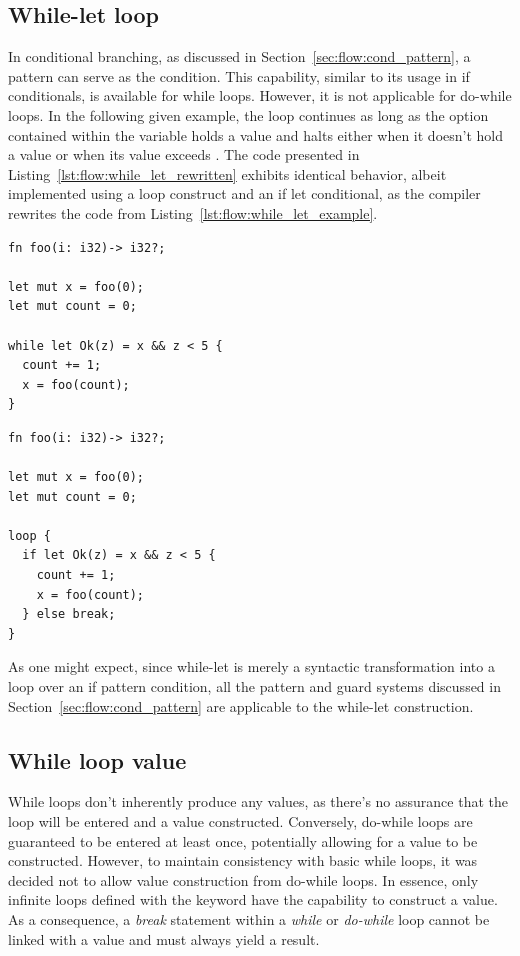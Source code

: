 \subsection{While-let loop}
\label{sec:flow:while_let_loop}

In conditional branching, as discussed in Section~\ref{sec:flow:cond_pattern}, a
pattern can serve as the condition. This capability, similar to its usage in if
conditionals, is available for while loops. However, it is not applicable for
do-while loops. In the following given example, the loop continues as long as
the option contained within the variable  holds a value and halts
either when it doesn't hold a value or when its value exceeds . The
code presented in Listing~\ref{lst:flow:while_let_rewritten} exhibits identical
behavior, albeit implemented using a loop construct and an if let conditional,
as the compiler rewrites the code from Listing~\ref{lst:flow:while_let_example}.

\begin{lstlisting}[style=coloredverbatim, caption=While-let example, label=lst:flow:while_let_example]
fn foo(i: i32)-> i32?;

let mut x = foo(0);
let mut count = 0;

while let Ok(z) = x && z < 5 {
  count += 1;
  x = foo(count);
}
\end{lstlisting}

\begin{lstlisting}[style=coloredverbatim, caption=While-let rewritten using loop and if-let, label=lst:flow:while_let_rewritten]
fn foo(i: i32)-> i32?;

let mut x = foo(0);
let mut count = 0;

loop {
  if let Ok(z) = x && z < 5 {
    count += 1;
    x = foo(count);
  } else break;
}
\end{lstlisting}

As one might expect, since while-let is merely a syntactic transformation into a
loop over an if pattern condition, all the pattern and guard systems discussed
in Section~\ref{sec:flow:cond_pattern} are applicable to the while-let construction.

\subsection{While loop value}

While loops don't inherently produce any values, as there's no assurance that
the loop will be entered and a value constructed. Conversely, do-while loops are
guaranteed to be entered at least once, potentially allowing for a value to be
constructed. However, to maintain consistency with basic while loops, it was
decided not to allow value construction from do-while loops. In essence, only
infinite loops defined with the  keyword have the capability to
construct a value. As a consequence, a \textit{break} statement within a
\textit{while} or \textit{do-while} loop cannot be linked with a value and must
always yield a  result.


\vfill%
\pagebreak
